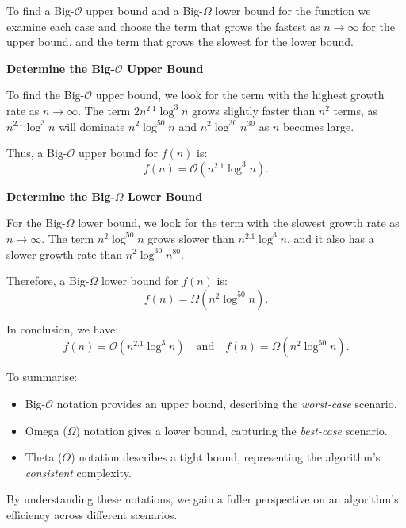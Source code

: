     \begin{solution}
        To find a Big-$\mathcal{O}$ upper bound and a Big-$\Omega$ lower bound for the function we examine each case and choose the term that grows the fastest as \( n \to \infty \) for the upper bound, and the term that grows the slowest for the lower bound.
        
        \textbf{Determine the Big-$\mathcal{O}$ Upper Bound}
        
        To find the Big-$\mathcal{O}$ upper bound, we look for the term with the highest growth rate as \( n \to \infty \). The term \( 2 n^{2.1} \log^3 n \) grows slightly faster than \( n^2 \) terms, as \( n^{2.1} \log^3 n \) will dominate \( n^2 \log^{50} n \) and \( n^2 \log^{30} n^{30} \) as \( n \) becomes large.
        
        Thus, a Big-$\mathcal{O}$ upper bound for \( f(n) \) is:
        \[
        f(n) = \mathcal{O}(n^{2.1} \log^3 n).
        \]
        
        \textbf{Determine the Big-$\Omega$ Lower Bound}
        
        For the Big-$\Omega$ lower bound, we look for the term with the slowest growth rate as \( n \to \infty \). The term \( n^2 \log^{50} n \) grows slower than \( n^{2.1} \log^3 n \), and it also has a slower growth rate than \( n^2 \log ^{30} n^{80} \).
        
        Therefore, a Big-$\Omega$ lower bound for \( f(n) \) is:
        \[
        f(n) = \Omega(n^2 \log^{50} n).
        \]
        
        In conclusion, we have:
        \[
        f(n) = \mathcal{O}(n^{2.1} \log^3 n) \quad \text{and} \quad f(n) = \Omega(n^2 \log^{50} n).
        \]\end{solution}

To summarise:
\begin{itemize}
    \item Big-$\mathcal{O}$ notation provides an upper bound, describing the \textit{worst-case} scenario.
    \item Omega ($\Omega$) notation gives a lower bound, capturing the \textit{best-case} scenario.
    \item Theta ($\Theta$) notation describes a tight bound, representing the algorithm’s \textit{consistent} complexity.
\end{itemize}

By understanding these notations, we gain a fuller perspective on an algorithm’s efficiency across different scenarios.

